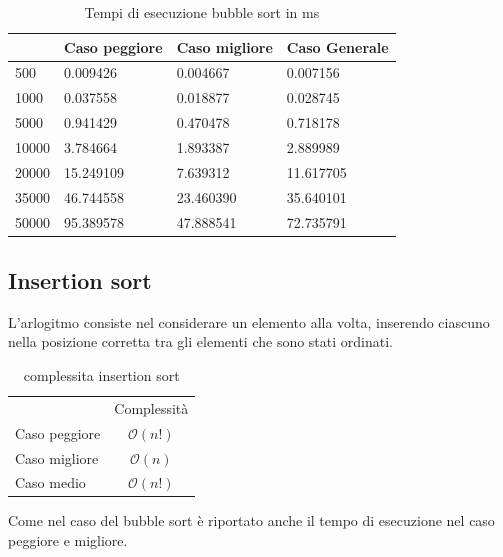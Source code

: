 \documentclass[12pt,a4paper]{report}
\begin{document}
\begin{table}[ht]
\centering
\begin{tabular}{| l | l | l | l |}
\hline
      & Caso peggiore & Caso migliore & Caso Generale \\ \hline
500   & 0.009426      & 0.004667      & 0.007156      \\ \hline
1000  & 0.037558      & 0.018877      & 0.028745      \\ \hline
5000  & 0.941429      & 0.470478      & 0.718178      \\ \hline
10000 & 3.784664      & 1.893387      & 2.889989      \\ \hline
20000 & 15.249109     & 7.639312      & 11.617705     \\ \hline
35000 & 46.744558     & 23.460390     & 35.640101     \\ \hline
50000 & 95.389578     & 47.888541     & 72.735791    \\ \hline
\end{tabular}
\caption{Tempi di esecuzione bubble sort in ms}
\label{Tab:Tempi esecuzione Bubblesort}
\end{table}

\newpage
\subsection{Insertion sort}
L'arlogitmo consiste nel considerare un elemento alla volta, inserendo ciascuno nella posizione corretta tra gli elementi che sono stati ordinati. 
\begin{table}[ht]
	\centering
	\begin{tabular}{lc}
              & Complessità \\
Caso peggiore &       $ \mathcal{O}(n!)$      \\
Caso migliore &           $ \mathcal{O}(n)$   \\
Caso medio &  $ \mathcal{O}(n!)$\\
\end{tabular}
	\caption{complessita insertion sort}
	\label{Tab:CompInsertionSort}
\end{table}


	

Come nel caso del bubble sort è riportato anche il tempo di esecuzione nel caso peggiore e migliore.
\end{document}
